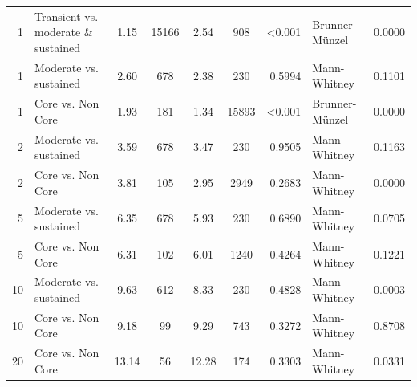 \begin{table}[H]
\begin{tabular}{r p{4cm} c c c c r l r}
1 & Transient vs. moderate \& sustained &  1.15 & 15166 & 2.54 & 908 & \textless 0.001 &  Brunner-Münzel & 0.0000 \\ 
1 & Moderate vs. sustained &  2.60 & 678 & 2.38 & 230 & 0.5994 &  Mann-Whitney & 0.1101 \\ 
1 & Core vs. Non Core &  1.93 & 181 & 1.34 & 15893 & \textless 0.001 &  Brunner-Münzel & 0.0000 \\ 
2 & Moderate vs. sustained &  3.59 & 678 & 3.47 & 230 & 0.9505 &  Mann-Whitney & 0.1163 \\ 
2 & Core vs. Non Core &  3.81 & 105 & 2.95 & 2949 & 0.2683 &  Mann-Whitney & 0.0000 \\ 
5 & Moderate vs. sustained &  6.35 & 678 & 5.93 & 230 & 0.6890 &  Mann-Whitney & 0.0705 \\ 
5 & Core vs. Non Core &  6.31 & 102 & 6.01 & 1240 & 0.4264 &  Mann-Whitney & 0.1221 \\ 
10 & Moderate vs. sustained &  9.63 & 612 & 8.33 & 230 & 0.4828 &  Mann-Whitney & 0.0003 \\ 
10 & Core vs. Non Core &  9.18 & 99 & 9.29 & 743 & 0.3272 &  Mann-Whitney & 0.8708 \\ 
20 & Core vs. Non Core &  13.14 & 56 & 12.28 & 174 & 0.3303 &  Mann-Whitney & 0.0331 \\ 
\bottomrule
\end{tabular}%
\label{tab:codebase_graph_latex_repository_graph_component_time_series_statistical_significance_test_normal_packages} 
\end{table}
\newpage 
